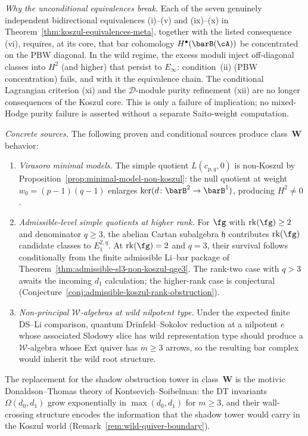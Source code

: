 \begin{remark}
\emph{Why the unconditional equivalences break.}
Each of the seven genuinely independent bidirectional
equivalences \textup{(i)--(v)} and \textup{(ix)--(x)} in
Theorem~\ref{thm:koszul-equivalences-meta}, together with the
listed consequence \textup{(vi)}, requires, at its core,
that bar cohomology $H^\bullet(\barB(\cA))$ be concentrated on the
PBW diagonal. In the wild regime, the excess moduli inject
off-diagonal classes into $H^2$ (and higher) that persist to
$E_\infty$: condition~(ii) (PBW concentration) fails, and with
it the equivalence chain. The conditional Lagrangian criterion
\textup{(xi)} and the $\mathcal{D}$-module purity refinement
\textup{(xii)} are no longer consequences of the Koszul core. This is
only a failure of implication; no mixed-Hodge purity failure is asserted
without a separate Saito-weight computation.

\emph{Concrete sources.}
The following proven and conditional sources produce class~$\mathbf{W}$
behavior:
\begin{enumerate}[label=\textup{(\roman*)}]
\item \emph{Virasoro minimal models.}
 The simple quotient $L(c_{p,q}, 0)$ is non-Koszul by
 Proposition~\ref{prop:minimal-model-non-koszul}: the null
 quotient at weight $w_0 = (p{-}1)(q{-}1)$ enlarges
 $\ker(d\colon \barB^2 \to \barB^1)$, producing $H^2 \neq 0$.
\item \emph{Admissible-level simple quotients at higher rank.}
 For $\fg$ with $\mathrm{rk}(\fg) \geq 2$ and denominator
 $q \geq 3$, the abelian Cartan subalgebra $\mathfrak{h}$
 contributes $\mathrm{rk}(\fg)$ candidate classes to $E_1^{2,q}$.
 At $\mathrm{rk}(\fg)=2$ and $q=3$, their survival follows
 conditionally from the finite admissible Li--bar package of
 Theorem~\ref{thm:admissible-sl3-non-koszul-qge3}.  The rank-two
 case with $q>3$ awaits the incoming $d_1$ calculation; the
 higher-rank case is conjectural
 (Conjecture~\ref{conj:admissible-koszul-rank-obstruction}).
\item \emph{Non-principal $\mathcal{W}$-algebras at wild nilpotent type.}
 Under the expected finite DS--Li comparison, quantum
 Drinfeld--Sokolov reduction at a nilpotent $e$ whose associated
 Slodowy slice has wild representation type should produce a
 $\mathcal{W}$-algebra whose Ext quiver has $m \geq 3$ arrows, so the
 resulting bar complex would inherit the wild root structure.
\end{enumerate}
The replacement for the shadow obstruction tower in
class~$\mathbf{W}$ is the motivic Donaldson--Thomas theory of
Kontsevich--Soibelman: the DT invariants $\Omega(d_0, d_1)$
grow exponentially in $\max(d_0, d_1)$ for $m \geq 3$, and
their wall-crossing structure encodes the information that the
shadow tower would carry in the Koszul world
(Remark~\ref{rem:wild-quiver-boundary}).
\end{remark}

